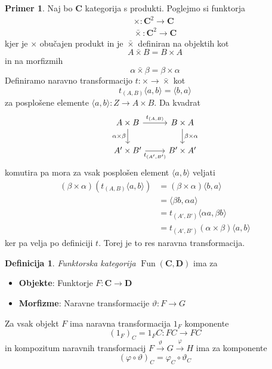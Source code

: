 \documentclass[12pt,a4paper]{book}
\theoremstyle{definition}
\newtheorem{definicija}{Definicija}[chapter]
\theoremstyle{plain}
\theoremstyle{definition}
\newtheorem{primer}{Primer}[section]
\theoremstyle{remark}
\newcommand{\cat}[1]{\textbf{#1}}
\DeclareMathOperator{\Fun}{Fun}
\begin{document}
\begin{primer}
Naj bo \cat{C} kategorija s produkti. Poglejmo si funktorja
\begin{align*}
\times : \cat{C}^2 \to \cat{C} \\
\bar{\times} : \cat{C}^2 \to \cat{C}
\end{align*}
kjer je $\times$ obučajen produkt in je $\bar{\times}$ definiran na objektih kot
$$ A \bar{\times} B = B \times A$$
in na morfizmih
$$ \alpha \bar{\times} \beta = \beta \times \alpha $$
Definiramo naravno transformacijo $t : \times \to \bar{\times}$ kot
$$t_{(A,B)}\langle a,b \rangle = \langle b,a \rangle$$
za posplošene elemente $\langle a,b \rangle : Z \to A \times B$.
Da kvadrat
$$ \begin{tikzcd}
A \times B \ar[d, "\alpha \times \beta"'] \ar[r, "t_{(A,B)}"] & B \times A \ar[d, "\beta \times \alpha"] \\
A' \times B' \ar[r, "t_{(A',B')}"'] & B' \times A'
\end{tikzcd} $$
komutira pa mora za vsak posplošen element $\langle a,b \rangle$ veljati
\begin{align*}
(\beta \times \alpha)(t_{(A,B)}\langle a,b \rangle ) &= (\beta \times \alpha)\langle b,a \rangle \\
& = \langle \beta b,\alpha a \rangle \\
& = t_{(A',B')}\langle \alpha a, \beta b \rangle \\
& = t_{(A', B')}(\alpha \times \beta)\langle a,b \rangle
\end{align*}
ker pa velja po definiciji $t$. Torej je to res naravna transformacija.
\end{primer}

\begin{definicija}
\emph{Funktorska kategorija} $\Fun(\cat{C}, \cat{D})$ ima za
\begin{itemize}
\item \textbf{Objekte}: Funktorje $F : \cat{C} \to \cat{D}$
\item \textbf{Morfizme}: Naravne transformacije $\vartheta : F \to G$
\end{itemize}
Za vsak objekt $F$ ima naravna transformacija $1_F$ komponente
$$ (1_F)_C = 1_FC : FC \to FC$$
in kompozitum naravnih transformacij $F \xrightarrow{\vartheta} G \xrightarrow{\varphi} H$
ima za komponente
$$ (\varphi \circ \vartheta)_C = \varphi_C \circ \vartheta_C $$
\end{definicija}
\end{document}
